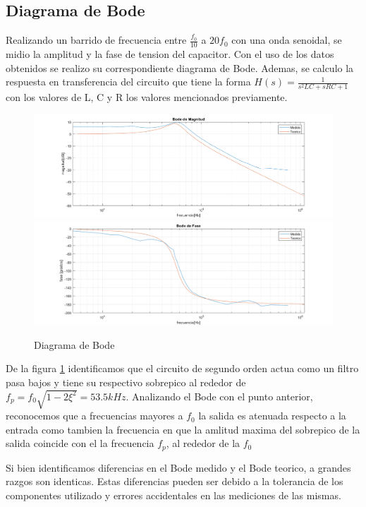 \subsection{Diagrama de Bode}

Realizando un barrido de frecuencia entre $\frac{f_0}{10}$ a $20f_0$ con una onda senoidal, se midio la amplitud y la fase de tension del capacitor. Con el uso de los datos obtenidos se realizo su correspondiente diagrama de Bode. Ademas, se calculo la respuesta en transferencia del circuito que tiene la forma $H(s)=\frac{1}{s^2LC+sRC+1}$ con los valores de L, C y R los valores mencionados previamente.

\begin{figure}[h!]
\centering
\includegraphics[scale=0.25]{2cmag.png}
\includegraphics[scale=0.25]{2cfase.png}
\caption{Diagrama de Bode}
\label{fig:LRC2c}
\end{figure}

\pagebreak

De la figura \ref{fig:LRC2c} identificamos que el circuito de segundo orden actua como un filtro pasa bajos y tiene su respectivo sobrepico al rededor de $f_p=f_0\sqrt{1-2\xi^2}=53.5kHz$. Analizando el Bode con el punto anterior, reconocemos que a frecuencias mayores a $f_0$ la salida es atenuada respecto a la entrada como tambien la frecuencia en que la amlitud maxima del sobrepico de la salida coincide con el la frecuencia $f_p$, al rededor de la $f_0$

Si bien identificamos diferencias en el Bode medido y el Bode teorico, a grandes razgos son identicas. Estas diferencias pueden ser debido a la tolerancia de los componentes utilizado y errores accidentales en las mediciones de las mismas. 


